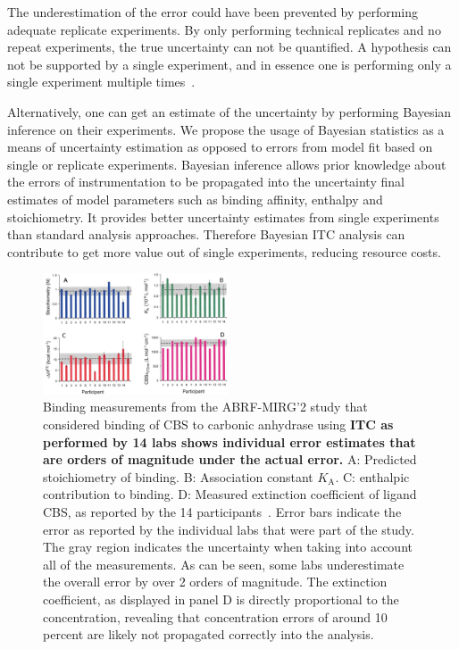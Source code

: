 \documentclass[10pt,final]{article}
\begin{document}
The underestimation of the error could have been prevented by performing adequate replicate experiments.
%
By only performing technical replicates and no repeat experiments, the true uncertainty can not be quantified.
%
A hypothesis can not be supported by a single experiment, and in essence one is performing only a single experiment multiple times~\autocite{Vaux2012a}.

Alternatively, one can get an estimate of the uncertainty by performing Bayesian inference on their experiments.
%
We propose the usage of Bayesian statistics as a means of uncertainty estimation as opposed to errors from model fit based on single or replicate experiments.
%
Bayesian inference allows prior knowledge about the errors of instrumentation to be propagated into the uncertainty final estimates of model parameters such as binding affinity, enthalpy and stoichiometry. 
%
It provides better uncertainty estimates from single experiments than standard analysis approaches.
%
Therefore Bayesian ITC analysis can contribute to get more value out of single experiments, reducing resource costs. 

\begin{figure}[H]
	\centering
	\includegraphics[width=0.49\textwidth]{figures/cbs_ca_II.PNG}
	\caption{Binding measurements from the ABRF-MIRG'2 study that considered binding of CBS to carbonic anhydrase using \textbf{ITC as performed by 14 labs shows individual error estimates that are orders of magnitude under the actual error.} A: Predicted stoichiometry of binding. B: Association constant $K_\mathrm{A}$. C: enthalpic contribution to binding. D: Measured extinction coefficient of ligand CBS, as reported by the 14 participants~\autocite{Myszka2003a}. Error bars indicate the error as reported by the individual labs that were part of the study. The gray region indicates the uncertainty when taking into account all of the measurements. As can be seen, some labs underestimate the overall error by over 2 orders of magnitude. The extinction coefficient, as displayed in panel D is directly proportional to the concentration, revealing that concentration errors of around 10 percent are likely not propagated correctly into the analysis.}
	\label{figure:abrf-mirg2}	
\end{figure}
\end{document}
